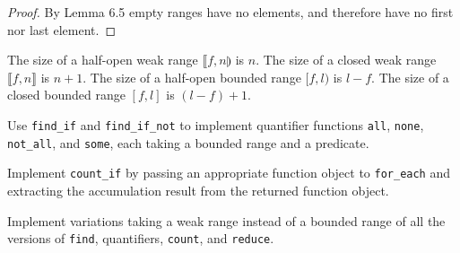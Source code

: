 \begin{proof}
	By Lemma 6.5 empty ranges have no elements, and therefore have no first nor last element.
\end{proof}

\begin{lemma}
	The size of a half-open weak range $\llbracket f, n \rrparenthesis$ is $n$. The size of a
	closed weak range $\llbracket f, n \rrbracket$ is $n + 1$. The size of a half-open bounded
	range $[f, l)$ is $l - f$. The size of a closed bounded range $[f, l]$ is $(l - f) + 1$.
\end{lemma}

\begin{exercise}
	Use \verb|find_if| and \verb|find_if_not| to implement quantifier functions \verb|all|,
	\verb|none|, \verb|not_all|, and \verb|some|, each taking a bounded range and a predicate.
\end{exercise}



\begin{exercise}
	Implement \verb|count_if| by passing an appropriate function object to \verb|for_each|
	and extracting the accumulation result from the returned function object.
\end{exercise}



\begin{exercise}
	Implement variations taking a weak range instead of a bounded range of all the versions
	of \verb|find|, quantifiers, \verb|count|, and \verb|reduce|.
\end{exercise}


